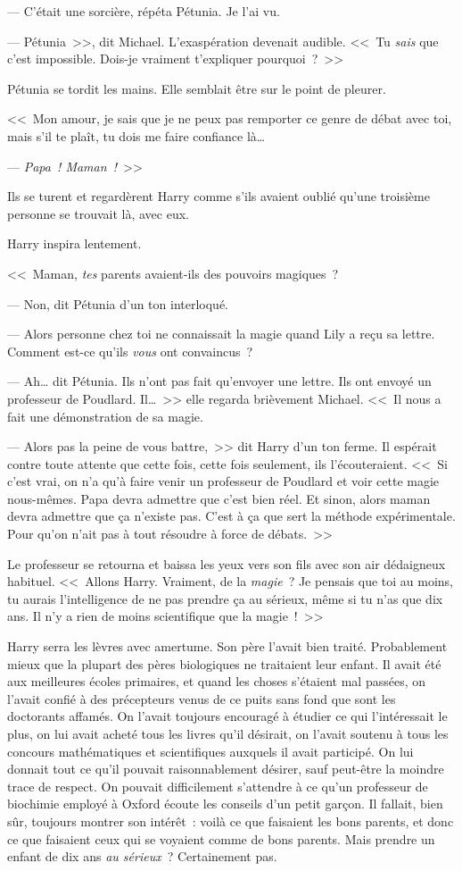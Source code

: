 --- C'était une sorcière, répéta Pétunia. Je l'ai vu.

--- Pétunia~>>, dit Michael. L'exaspération devenait audible. <<~Tu \emph{sais} que c'est impossible. Dois-je vraiment t'expliquer pourquoi~?~>>

Pétunia se tordit les mains. Elle semblait être sur le point de pleurer.

<<~Mon amour, je sais que je ne peux pas remporter ce genre de débat avec toi, mais s'il te plaît, tu dois me faire confiance là…

--- \emph{Papa~! Maman~!}~>>

Ils se turent et regardèrent Harry comme s'ils avaient oublié qu'une troisième personne se trouvait là, avec eux.

Harry inspira lentement.

<<~Maman, \emph{tes} parents avaient-ils des pouvoirs magiques~?

--- Non, dit Pétunia d'un ton interloqué.

--- Alors personne chez toi ne connaissait la magie quand Lily a reçu sa lettre. Comment est-ce qu'ils \emph{vous} ont convaincus~?

--- Ah… dit Pétunia. Ils n'ont pas fait qu'envoyer une lettre. Ils ont envoyé un professeur de Poudlard. Il…~>> elle regarda brièvement Michael. <<~Il nous a fait une démonstration de sa magie.

--- Alors pas la peine de vous battre,~>> dit Harry d'un ton ferme. Il espérait contre toute attente que cette fois, cette fois seulement, ils l'écouteraient. <<~Si c'est vrai, on n'a qu'à faire venir un professeur de Poudlard et voir cette magie nous-mêmes. Papa devra admettre que c'est bien réel. Et sinon, alors maman devra admettre que ça n'existe pas. C'est à ça que sert la méthode expérimentale. Pour qu'on n'ait pas à tout résoudre à force de débats.~>>

Le professeur se retourna et baissa les yeux vers son fils avec son air dédaigneux habituel. <<~Allons Harry. Vraiment, de la \emph{magie}~? Je pensais que toi au moins, tu aurais l'intelligence de ne pas prendre ça au sérieux, même si tu n'as que dix ans. Il n'y a rien de moins scientifique que la magie~!~>>

Harry serra les lèvres avec amertume. Son père l'avait bien traité. Probablement mieux que la plupart des pères biologiques ne traitaient leur enfant. Il avait été aux meilleures écoles primaires, et quand les choses s'étaient mal passées, on l'avait confié à des précepteurs venus de ce puits sans fond que sont les doctorants affamés. On l'avait toujours encouragé à étudier ce qui l'intéressait le plus, on lui avait acheté tous les livres qu'il désirait, on l'avait soutenu à tous les concours mathématiques et scientifiques auxquels il avait participé. On lui donnait tout ce qu'il pouvait raisonnablement désirer, sauf peut-être la moindre trace de respect. On pouvait difficilement s'attendre à ce qu'un professeur de biochimie employé à Oxford écoute les conseils d'un petit garçon. Il fallait, bien sûr, toujours montrer son intérêt~: voilà ce que faisaient les bons parents, et donc ce que faisaient ceux qui se voyaient comme de bons parents. Mais prendre un enfant de dix ans \emph{au sérieux}~? Certainement pas.


